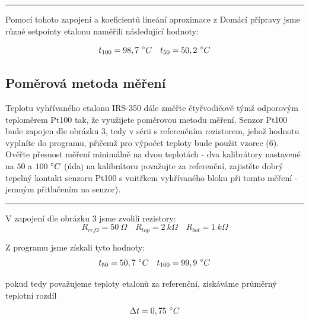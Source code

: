 \documentclass[a4paper,12pt]{article}
\begin{document}
\par\noindent\rule{\textwidth}{0.4pt}
Pomocí tohoto zapojení a koeficientů lineání aproximace z Domácí přípravy jsme různé setpointy etalonu naměřili následující hodnoty:

$$
  t_{100} = 98,7\ \degree C \quad t_{50} = 50,2\ \degree C
$$

\subsection{Poměrová metoda měření}
Teplotu vyhřívaného etalonu IRS-350 dále změřte čtyřvodičově týmž odporovým teploměrem Pt100
tak, že využijete poměrovou metodu měření. Senzor Pt100 bude zapojen dle obrázku 3, tedy v sérii
s referenčním rezistorem, jehož hodnotu vyplníte do programu, přičemž pro výpočet teploty bude
použit vzorec (6). Ověřte přesnost měření minimálně na dvou teplotách - dva kalibrátory nastavené
na $50$ a $100\ \degree C$ (údaj na kalibrátoru považujte za referenční, zajistěte dobrý tepelný kontakt senzoru
Pt100 s vnitřkem vyhřívaného bloku při tomto měření - jemným přitlačením na senzor).

\par\noindent\rule{\textwidth}{0.4pt}

V zapojení dle obrázku 3 jsme zvolili rezistory:
$$
R_{ref2} = 50\ \Omega \quad R_{top} = 2\ k\Omega \quad R_{bot} = 1\ k\Omega
$$

Z programu jsme získali tyto hodnoty:
$$
t_{50} = 50,7\ \degree C \quad t_{100} = 99,9\ \degree C
$$

pokud tedy považujeme teploty etalonů za referenční, získáváme průměrný teplotní rozdíl
$$
\Delta t = 0,75\ \degree C
$$
\end{document}
